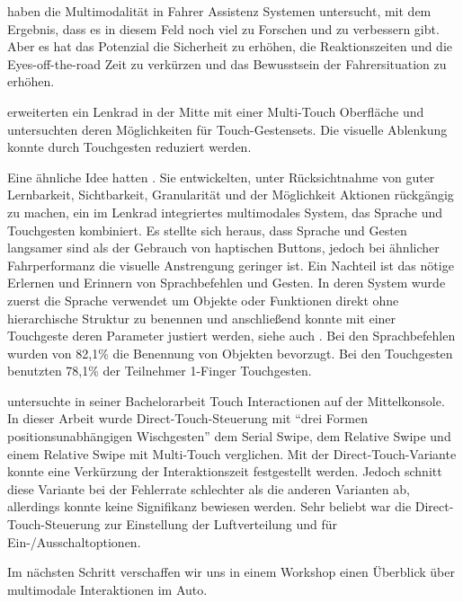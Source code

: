 \citet{Bertoldi:2010} haben die Multimodalität in Fahrer Assistenz Systemen untersucht, mit dem Ergebnis, dass es in diesem Feld noch viel zu Forschen und zu verbessern gibt. 
Aber es hat das Potenzial die Sicherheit zu erhöhen, die Reaktionszeiten und die Eyes-off-the-road Zeit zu verkürzen und das Bewusstsein der Fahrersituation zu erhöhen. 

\citet{Doring:2011} erweiterten ein Lenkrad in der Mitte mit einer Multi-Touch Oberfläche und untersuchten deren Möglichkeiten für Touch-Gestensets. 
Die visuelle Ablenkung konnte durch Touchgesten reduziert werden. 

Eine ähnliche Idee hatten \citet{Pfleging_2012}. 
Sie entwickelten, unter Rücksichtnahme von guter Lernbarkeit, Sichtbarkeit, Granularität und der Möglichkeit Aktionen rückgängig zu machen, ein im Lenkrad integriertes multimodales System, das Sprache und Touchgesten kombiniert. 
Es stellte sich heraus, dass Sprache und Gesten langsamer sind als der Gebrauch von haptischen Buttons, jedoch bei ähnlicher Fahrperformanz die visuelle Anstrengung geringer ist. 
Ein Nachteil ist das nötige Erlernen und Erinnern von Sprachbefehlen und Gesten. 
In deren System wurde zuerst die Sprache verwendet um Objekte oder Funktionen direkt ohne hierarchische Struktur zu benennen und anschließend konnte mit einer Touchgeste deren Parameter justiert werden, siehe auch \citep{Pfleging_t_2011}. 
Bei den Sprachbefehlen wurden von 82,1\% die Benennung von Objekten bevorzugt. 
Bei den Touchgesten benutzten 78,1\% der Teilnehmer 1-Finger Touchgesten. 

\citet{stracke2014touch} untersuchte in seiner Bachelorarbeit Touch Interactionen auf der Mittelkonsole. 
In dieser Arbeit wurde Direct-Touch-Steuerung mit "`drei Formen positionsunabhängigen Wischgesten"' \cite[Seite 57]{stracke2014touch} dem Serial Swipe, dem Relative Swipe und einem Relative Swipe mit Multi-Touch verglichen. 
Mit der Direct-Touch-Variante konnte eine Verkürzung der Interaktionszeit festgestellt werden. 
Jedoch schnitt diese Variante bei der Fehlerrate schlechter als die anderen Varianten ab, allerdings konnte keine Signifikanz bewiesen werden. 
Sehr beliebt war die Direct-Touch-Steuerung zur Einstellung der Luftverteilung und für Ein-/Ausschaltoptionen. 

Im nächsten Schritt verschaffen wir uns in einem Workshop einen Überblick über multimodale Interaktionen im Auto.